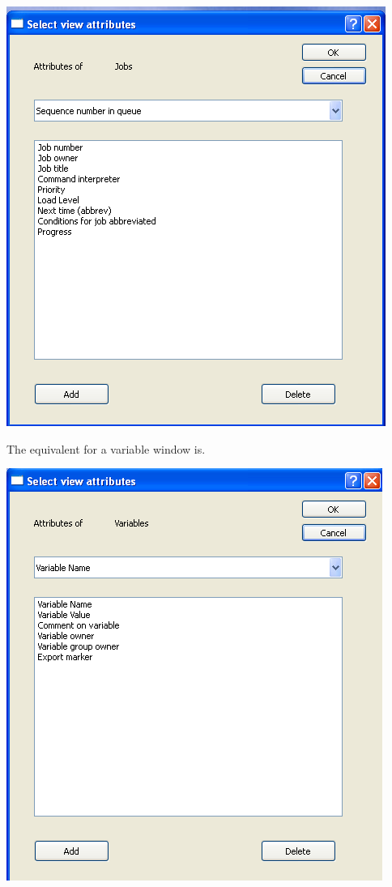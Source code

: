 \includegraphics{img/btqwjlistfmt.png}

The equivalent for a variable window is.

\includegraphics{img/btqwvlistfmt.png}

